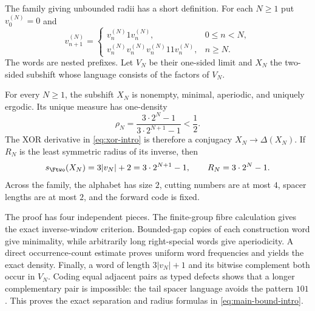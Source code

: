 The family giving unbounded radii has a short definition.  For each $N\geq1$
put $v^{(N)}_0=0$ and
\begin{equation}\label{eq:construction-intro}
 v^{(N)}_{n+1}=
 \begin{cases}
  v^{(N)}_n1v^{(N)}_n,&0\leq n<N,\\
  v^{(N)}_nv^{(N)}_nv^{(N)}_n11v^{(N)}_n,&n\geq N.
 \end{cases}
\end{equation}
The words are nested prefixes.  Let $V_N$ be their one-sided limit and $X_N$
the two-sided subshift whose language consists of the factors of $V_N$.

\begin{theorem}\label{thm:main-intro}
For every $N\geq1$, the subshift $X_N$ is nonempty, minimal, aperiodic, and
uniquely ergodic.  Its unique measure has one-density
\begin{equation}\label{eq:density-intro}
 \rho_N=\frac{3\cdot2^N-1}{3\cdot2^{N+1}-1}<\frac12.
\end{equation}
The XOR derivative in \eqref{eq:xor-intro} is therefore a conjugacy
$X_N\to\Delta(X_N)$.  If $R_N$ is the least symmetric radius of its inverse,
then
\begin{equation}\label{eq:main-bound-intro}
 s_{\Ftwo}(X_N)=3|v_N|+2=3\cdot2^{N+1}-1,
 \qquad R_N=3\cdot2^N-1.
\end{equation}
Across the family, the alphabet has size $2$, cutting numbers are at most
$4$, spacer lengths are at most $2$, and the forward code is fixed.
\end{theorem}

The proof has four independent pieces.  The finite-group fibre calculation
gives the exact inverse-window criterion.  Bounded-gap copies of each
construction word give minimality, while arbitrarily long right-special
words give aperiodicity.  A direct occurrence-count estimate proves uniform
word frequencies and yields the exact density.  Finally, a word of length
$3|v_N|+1$ and its bitwise complement both occur in $V_N$.  Coding equal
adjacent pairs as typed defects shows that a longer complementary pair is
impossible: the tail spacer language avoids the pattern $101$.  This proves
the exact separation and radius formulas in \eqref{eq:main-bound-intro}.
